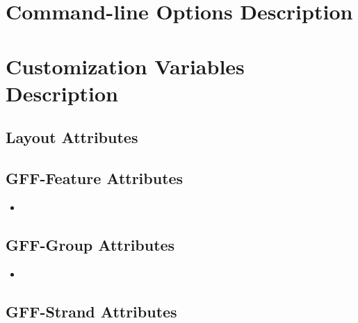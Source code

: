 \documentclass[11pt]{article}
\newcommand{\sctn}[1]{\section{#1}}
\newcommand{\subsctn}[1]{\subsection{#1}}
\def\prog{\textsc{\textbf{gff2aplot}}}
\begin{document}
\tableofcontents

\listoffigures

\listoftables


\newpage
{}
\setcounter{page}{1}

%
% 

%
% 

%
% 

%
% 

%
% 

%
% 


\sctn{Command-line Options Description}

\newcommand{\setlist}{
 \setlength{\leftmargin}{0.5cm}
 \setlength{\itemindent}{-0.5cm}
 \setlength{\labelwidth}{0pt}
 \setlength{\labelsep}{0pt}
 \renewcommand{\labelitemi}{}
} %

 \begin{itemize}\setlist
 \end{itemize}

\newpage

\sctn{Customization Variables Description}


\subsctn{Layout Attributes}

 \begin{itemize}\setlist
  
 \end{itemize}

\subsctn{GFF-Feature Attributes}

 \begin{itemize}\setlist
  
  \item 
 \end{itemize}

\subsctn{GFF-Group Attributes}

 \begin{itemize}\setlist
  
  \item 
 \end{itemize}

\subsctn{GFF-Strand Attributes}
\end{document}
